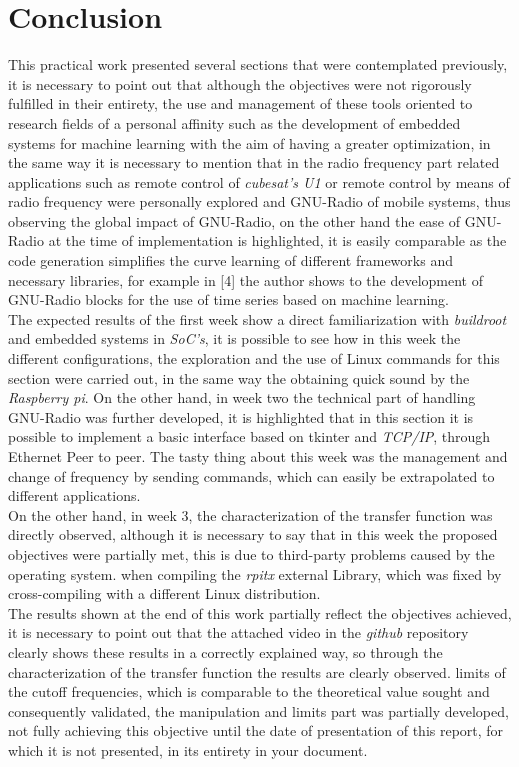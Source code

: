 \documentclass[12pt, twoside]{report}
\begin{document}
    
\chapter{Conclusion}
This practical work presented several sections that were contemplated previously, it is necessary to point out that although the objectives were not rigorously fulfilled in their entirety, the use and management of these tools oriented to research fields of a personal affinity such as the development of embedded systems for machine learning with the aim of having a greater optimization, in the same way it is necessary to mention that in the radio frequency part related applications such as remote control of \textit{cubesat's U1} or remote control by means of radio frequency were personally explored and GNU-Radio of mobile systems, thus observing the global impact of GNU-Radio, on the other hand the ease of GNU-Radio at the time of implementation is highlighted, it is easily comparable as the code generation simplifies the curve learning of different frameworks and necessary libraries, for example in [4] the author shows to the development of GNU-Radio blocks for the use of time series based on machine learning.\\
The expected results of the first week show a direct familiarization with \textit{buildroot} and embedded systems in \textit{SoC's}, it is possible to see how in this week the different configurations, the exploration and the use of Linux commands for this section were carried out, in the same way the obtaining quick sound by the \textit{Raspberry pi}. On the other hand, in week two the technical part of handling GNU-Radio was further developed, it is highlighted that in this section it is possible to implement a basic interface based on tkinter and \textit{TCP/IP}, through Ethernet Peer to peer. The tasty thing about this week was the management and change of frequency by sending commands, which can easily be extrapolated to different applications.\\
On the other hand, in week 3, the characterization of the transfer function was directly observed, although it is necessary to say that in this week the proposed objectives were partially met, this is due to third-party problems caused by the operating system. when compiling the \textit{rpitx} external Library, which was fixed by cross-compiling with a different Linux distribution.\\
The results shown at the end of this work partially reflect the objectives achieved, it is necessary to point out that the attached video in the \textit{github} repository clearly shows these results in a correctly explained way, so through the characterization of the transfer function the results are clearly observed. limits of the cutoff frequencies, which is comparable to the theoretical value sought and consequently validated, the manipulation and limits part was partially developed, not fully achieving this objective until the date of presentation of this report, for which it is not presented, in its entirety in your document.
\medskip
\end{document}
